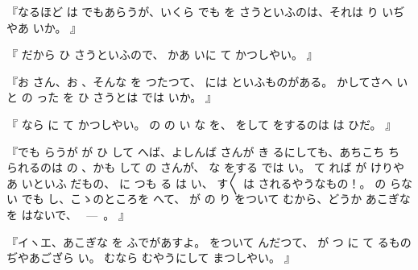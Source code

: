 『なるほど
は
でもあらうが、いくら
でも
を
さうといふのは、それは
り
いぢやあ
いか。
』

『
だから
ひ
さうといふので、
かあ
いに
て
かつしやい。
』

『お
さん、お
、そんな
を
つたつて、
には
といふものがある。
かしてさへ
いと
の
った
を
ひ
さうとは
では
いか。
』

『
なら
に
て
かつしやい。
の
の
い
な
を、
をして
をするのは
は
ひだ。
』

『でも
らうが
が
ひ
して
へば、よしんば
さんが
き
るにしても、あちこち
ち
られるのは
の
、かも
して
の
さんが、
な
をする
では
い。
て
れば
が
けりやあ
いといふ
だもの、
に
つも
る
は
い、
す〳〵
は
されるやうなもの！。
の
らない
でも
し、こゝのところを
へて、
が
の
り
をついて
むから、どうか
あこぎな
を
はないで、
\ ---\ 。
』

『イヽエ、あこぎな
を
ふでがあすよ。
をついて
んだつて、
が
つ
に
て
るものぢやあござら
い。
むなら
むやうにして
まつしやい。
』


